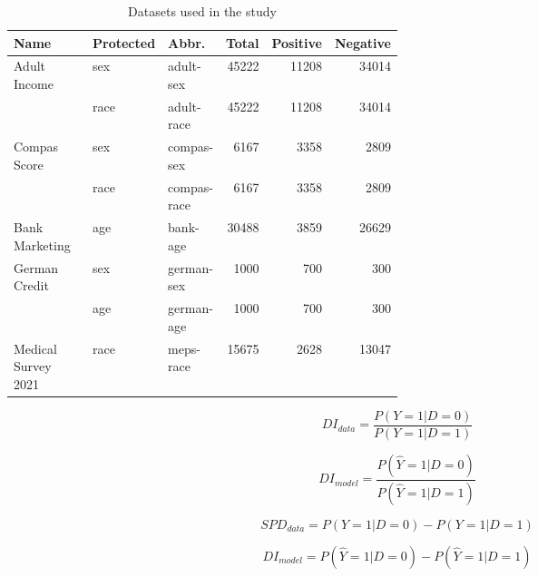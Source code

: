 \documentclass{article}
\begin{document}
\begin{table}[htb]
  \centering
  \caption{Datasets used in the study}
  \begin{tabular}{p{0.3\linewidth} p{0.1\linewidth} p{0.1\linewidth} r r r}
    \toprule

    \textbf{Name} & \textbf{Protected} & \textbf{Abbr.} &
    \textbf{Total} & \textbf{Positive} & \textbf{Negative}\\

    \midrule

    \multirow{2}{*}{Adult Income \cite{CITEME}} & sex & adult-sex & 45222 & 11208 &
    34014\\
      & race & adult-race & 45222 & 11208 & 34014\\
    \multirow{2}{*}{Compas Score \cite{CITEME}} & sex & compas-sex &
    6167 & 3358 & 2809\\
      & race & compas-race & 6167 & 3358 & 2809\\
    Bank Marketing \cite{CITEME} & age & bank-age & 30488 & 3859 &
    26629\\
    \multirow{2}{*}{German Credit \cite{CITEME}} & sex & german-sex &
    1000 & 700 & 300\\
      & age & german-age & 1000 & 700 & 300\\
    Medical Survey 2021 \cite{CITEME} & race & meps-race & 15675 &
    2628 & 13047\\
    \bottomrule
  \end{tabular}
  \label{tab:datasets}
  \end{table}

\begin{equation}
  DI_{data} = \frac{P(Y=1|D=0)}{P(Y=1|D=1)}
  \label{eq:di-data}
\end{equation}

\begin{equation}
  DI_{model} = \frac{P(\hat{Y}=1|D=0)}{P(\hat{Y}=1|D=1)}
  \label{eq:di-model}
\end{equation}

\begin{equation}
  SPD_{data} = P(Y=1|D=0)-P(Y=1|D=1)
  \label{eq:spd-data}
\end{equation}

\begin{equation}
  DI_{model} = P(\hat{Y}=1|D=0)-P(\hat{Y}=1|D=1)
  \label{eq:spd-model}
\end{equation}
\end{document}
